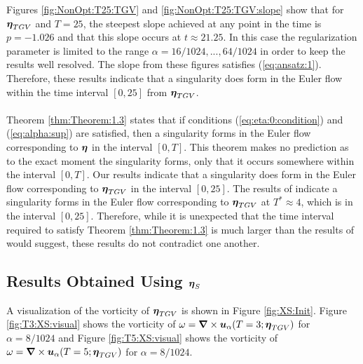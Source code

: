 {\noindent Figures \ref{fig:NonOpt:T25:TGV} and \ref{fig:NonOpt:T25:TGV:slope} show that for ${\boldsymbol \eta}_{TGV}$ and $T=25$, the steepest slope achieved at any point in the time is $p=-1.026$ and that this slope occurs at $t\approx 21.25$. In this case the regularization parameter is limited to the range $\alpha=16/1024,...,64/1024$ in order to keep the results well resolved. The slope from these figures satisfies (\ref{eq:ansatz:1}). Therefore, these results indicate that a singularity does form in the Euler flow within the time interval $[0,25]$ from ${\boldsymbol \eta}_{TGV}$.
\\~\\
Theorem \ref{thm:Theorem:1.3} states that if conditions (\ref{eq:eta:0:condition}) and (\ref{eq:alpha:sup}) are satisfied, then a singularity forms in the Euler flow corresponding to ${\boldsymbol \eta}$ in the interval $[0,T]$. This theorem makes no prediction as to the exact moment the singularity forms, only that it occurs somewhere within the interval $[0,T]$. Our results indicate that a singularity does form in the Euler flow corresponding to ${\boldsymbol \eta}_{TGV}$ in the interval $[0,25]$. The results of \cite{bustamante_interplay_2012} indicate a singularity forms in the Euler flow corresponding to ${\boldsymbol \eta}_{TGV}$ at $T^* \approx 4$, which is in the interval $[0,25]$. Therefore, while it is unexpected that the time interval required to satisfy Theorem \ref{thm:Theorem:1.3} is much larger than the results of \cite{bustamante_interplay_2012} would suggest, these results do not contradict one another. 


\subsection{Results Obtained Using ${\boldsymbol \eta}_{S}$}

A visualization of the vorticity of ${\boldsymbol \eta}_{TGV}$ is shown in Figure \ref{fig:XS:Init}. Figure \ref{fig:T3:XS:visual} shows the vorticity of $\omega = {\boldsymbol \nabla} \times \boldsymbol u_\alpha(T=3;{\boldsymbol \eta}_{TGV})$ for $\alpha=8/1024$ and Figure \ref{fig:T5:XS:visual} shows the vorticity of $\omega = {\boldsymbol \nabla} \times \boldsymbol u_\alpha(T=5;{\boldsymbol \eta}_{TGV})$ for $\alpha=8/1024$.


}

